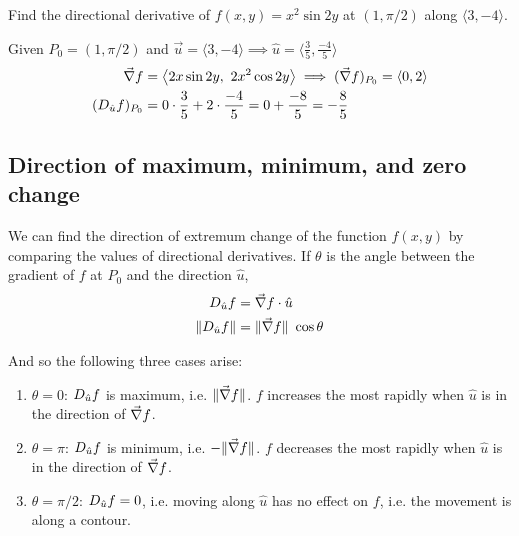 \begin{example}
    \normalfont Find the directional derivative of $f(x, y) = x^2 \sin{2y}$ at $(1, \pi/2)$ along $\langle 3, -4 \rangle$.

    Given $P_0 = (1, \pi/2)$ and $\vec{u} = \langle 3, -4 \rangle \implies \hat{u} = \langle \frac{3}{5}, \frac{-4}{5} \rangle$
    \begin{align*}
        \vec{\nabla} f &= \left\langle 2x \sin{2y},\ 2 x^2 \cos{2y} \right\rangle \implies
        (\vec{\nabla} f)_{P_0} = \langle 0, 2\rangle \\
        (D_{\hat{u}}f)_{P_0} &= 0 \cdot \frac{3}{5} + 2 \cdot \frac{-4}{5} = 0 + \frac{-8}{5} = - \frac{8}{5}
    \end{align*}
\end{example}


\subsection{Direction of maximum, minimum, and zero change}

We can find the direction of extremum change of the function $f(x, y)$ by comparing the values of directional derivatives.
If $\theta$ is the angle between the gradient of $f$ at $P_0$ and the direction $\hat{u}$,
\begin{align*}
    D_{\hat{u}}f &= \vec{\nabla} f \cdot \hat{u} \\
    \lVert D_{\hat{u}}f \rVert &= \lVert \vec{\nabla} f \rVert\ \cos{\theta}
\end{align*}

And so the following three cases arise:
\begin{enumerate}
    \item $\theta = 0$: $D_{\hat{u}}f$ is maximum, i.e. $\lVert \vec{\nabla} f \rVert$. $f$ increases the most rapidly
    when $\hat{u}$ is in the direction of $\vec{\nabla} f$.

    \item $\theta = \pi$: $D_{\hat{u}}f$ is minimum, i.e. $- \lVert \vec{\nabla} f \rVert$. $f$ decreases the most rapidly
    when $\hat{u}$ is in the direction of $\vec{\nabla} f$.

    \item $\theta = \pi/2$: $D_{\hat{u}}f = 0$, i.e. moving along $\hat{u}$ has no effect on $f$, i.e. the movement is along a contour.
\end{enumerate}

